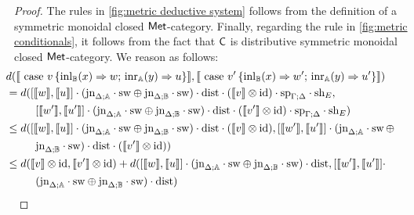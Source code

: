 \begin{proof}
   The rules in \autoref{fig:metric deductive system} follows from the definition of a symmetric monoidal closed $\mathsf{Met}$-category. Finally, regarding  the rule in  \autoref{fig:metric conditionals}, it follows from the fact that $\mathsf{C}$ is distributive symmetric monoidal closed $\mathsf{Met}$-category. We reason as follows:
  \begin{align*}
    & \hspace{-20pt} d( \llbracket  \text{ case } v \, \{\text{inl}_{\typeB}  (x) \Rightarrow w ; \, \text{inr}_{\typeA} (y) \Rightarrow u\}  \rrbracket, \llbracket \text{ case } v' \, \{\text{inl}_{\typeB}  (x) \Rightarrow w' ; \, \text{inr}_{\typeA} (y) \Rightarrow u'\} \rrbracket)  \\
    &  \hspace{-20pt} = d( [\llbracket w\rrbracket ,\llbracket u\rrbracket] \comp (\text{jn}_{\Delta;\typeA}\comp \sw \oplus \text{jn}_{\Delta;\typeB}\comp \sw) \comp \dist \comp (\llbracket v\rrbracket \otimes \text{id}) \comp \text{sp}_{\Gamma;\Delta} \comp \text{sh}_{E}, \\
    & \hspace{7pt} [\llbracket w'\rrbracket ,\llbracket u'\rrbracket] \comp (\text{jn}_{\Delta;\typeA}\comp \sw \oplus \text{jn}_{\Delta;\typeB}\comp \sw) \comp \dist \comp (\llbracket v'\rrbracket \otimes \text{id}) \comp \text{sp}_{\Gamma;\Delta} \comp \text{sh}_{E})\\
    & \hspace{-20pt} \leq  d( [\llbracket w\rrbracket ,\llbracket u\rrbracket] \comp (\text{jn}_{\Delta;\typeA}\comp \sw \oplus \text{jn}_{\Delta;\typeB}\comp \sw) \comp \dist \comp (\llbracket v\rrbracket \otimes \text{id}),  [\llbracket w'\rrbracket ,\llbracket u'\rrbracket] \comp (\text{jn}_{\Delta;\typeA}\comp \sw \, \oplus \\
    & \hspace{7pt}  \text{jn}_{\Delta;\typeB}\comp \sw) \comp \dist \comp (\llbracket v'\rrbracket \otimes \text{id}) )\\
    & \hspace{-20pt} \leq  d(\llbracket v\rrbracket \otimes \text{id}, \llbracket v'\rrbracket \otimes \text{id}) +  d( [\llbracket w\rrbracket ,\llbracket u\rrbracket] \comp (\text{jn}_{\Delta;\typeA}\comp \sw \oplus \text{jn}_{\Delta;\typeB}\comp \sw) \comp \dist,  [\llbracket w'\rrbracket ,\llbracket u'\rrbracket]\comp \\
    & \hspace{7pt} (\text{jn}_{\Delta;\typeA}\comp \sw \oplus \text{jn}_{\Delta;\typeB}\comp \sw) \comp \dist) \\

\end{align*}
\end{proof}
